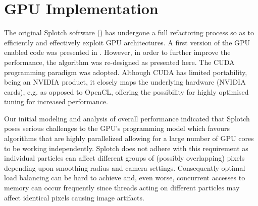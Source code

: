 \section{GPU Implementation}

The original Splotch software (\citet{2008NJPh...10l5006D}) has undergone a full refactoring process so as to
efficiently and effectively exploit GPU architectures. A first version of the GPU enabled code was presented in 
\citet{jin:high-performance}. However, in order to further improve the performance, the 
algorithm was re-designed as presented here. 
The CUDA programming paradigm was adopted. Although CUDA has limited portability, being an NVIDIA product, it closely maps the underlying hardware (NVIDIA cards), e.g. as opposed to OpenCL, offering the possibility for highly optimised tuning for increased performance.

Our initial modeling and analysis of overall performance indicated that
Splotch poses serious challenges
to the GPU's programming model which favours algorithms that are highly parallelized allowing for a large number of 
GPU cores to be working independently. Splotch does not adhere with this requirement as individual particles can affect different groups of (possibly overlapping) pixels depending upon smoothing radius and camera settings. Consequently optimal load balancing can be hard to achieve
and, even worse, concurrent accesses to memory can occur frequently since threads acting on different particles may
affect identical pixels causing image artifacts.

